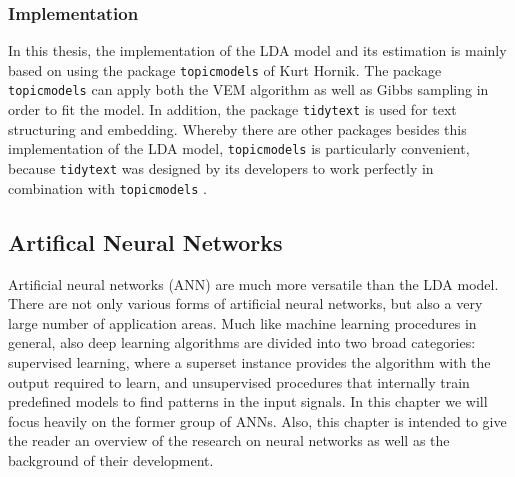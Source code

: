 \documentclass[11pt,a4paper]{article}
\begin{document}
\subsubsection{Implementation}

In this thesis, the implementation of the LDA model and its estimation is mainly based on using the package \texttt{topicmodels} of Kurt Hornik. The package \texttt{topicmodels} can apply both the VEM algorithm as well as Gibbs sampling in order to fit the model. In addition, the package \texttt{tidytext} is used for text structuring and embedding. Whereby there are other packages besides this implementation of the LDA model, \texttt{topicmodels} is particularly convenient, because \texttt{tidytext} was designed by its developers to work perfectly in combination with \texttt{topicmodels} \cite[p. 89]{Silge2017}.


\subsection{Artifical Neural Networks}

Artificial neural networks (ANN) are much more versatile than the LDA model. There are not only various forms of artificial neural networks, but also a very large number of application areas. Much like machine learning procedures in general, also deep learning algorithms are divided into two broad categories: supervised learning, where a superset instance provides the algorithm with the output required to learn, and unsupervised procedures that internally train predefined models to find patterns in the input signals. In this chapter we will focus heavily on the former group of ANNs. Also, this chapter is intended to give the reader an overview of the research on neural networks as well as the background of their development. \\
\end{document}
